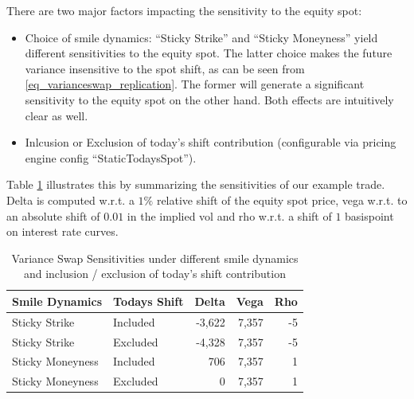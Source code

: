 There are two major factors impacting the sensitivity to the equity spot:

\begin{itemize}
\item Choice of smile dynamics: ``Sticky Strike'' and ``Sticky Moneyness'' yield different sensitivities to the equity
  spot. The latter choice makes the future variance insensitive to the spot shift, as can be seen from
  \ref{eq_varianceswap_replication}. The former will generate a significant sensitivity to the equity spot on the other
  hand. Both effects are intuitively clear as well.
\item Inlcusion or Exclusion of today's shift contribution (configurable via pricing engine config
  ``StaticTodaysSpot'').
\end{itemize}

Table \ref{eq_var_swap_pricing_sensi_overview} illustrates this by summarizing the sensitivities of our example
trade. Delta is computed w.r.t. a $1\%$ relative shift of the equity spot price, vega w.r.t. to an absolute shift of
$0.01$ in the implied vol and rho w.r.t. a shift of $1$ basispoint on interest rate curves.

\begin{table}[ht]
\begin{center}
\begin{tabular}{l|l|r|r|r}
Smile Dynamics & Todays Shift & Delta & Vega & Rho \\
\hline
Sticky Strike & Included &  -3,622   & 7,357  & -5 \\
Sticky Strike & Excluded &  -4,328   & 7,357  & -5 \\
Sticky Moneyness & Included &  706   & 7,357  & 1 \\
Sticky Moneyness & Excluded &  0 & 7,357  & 1 \\
\end{tabular}
\end{center}
\caption{Variance Swap Sensitivities under different smile dynamics and inclusion / exclusion of today's shift
  contribution}
\label{eq_var_swap_pricing_sensi_overview}
\end{table}
